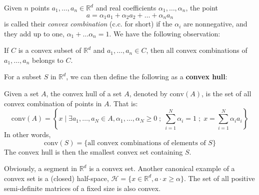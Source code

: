 Given $n$ points $a_{1},\dots,a_{n}\in \mathbb{R}^{d}$ and real coefficients $\alpha_{1},\dots,\alpha_{n}$, the point \begin{equation}
    a= \alpha_{1}a_{1} + \alpha_{2}a_{2} + \dots + \alpha_{n} a_{n}
\end{equation}
is called their \textit{convex combination} (c.c. for short) if the $\alpha_{i}$ are nonnegative, and they add up to one, $\alpha_{1}+\dots\alpha_{n}=1$. We have the following observation: 
\begin{lemma}
    If $C$ is a convex subset of $\mathbb{R}^{d}$ and $a_{1},\dots,a_{n}\in C$, then all convex combinations of $a_{1},\dots,a_{n}$ belongs to $C$. 
\end{lemma}
For a subset $S$ in $\mathbb{R}^{d}$, we can then define the following as a \textbf{convex hull}: 
\begin{definition}
    Given a set $A$, the convex hull of a set $A$, denoted by $\mathrm{conv}(A)$, is the set of all convex combination of points in $A$. That is: 
    \begin{equation}
        \mathrm{conv}(A) = \left\{ x \mid \exists a_{1},\dots,a_{N}\in A, \alpha_{1},\dots,\alpha_{N}\geq 0\; ;\; \sum^{N}_{i=1}\alpha_{i} = 1\; ;\;  x= \sum^{N}_{i=1}\alpha_{i} a_{i} \right\}
    \end{equation}
    In other words, 
    \begin{equation}
        \mathrm{conv}(S) = \{\text{all convex combinations of elements of }S\}
    \end{equation}
    The convex hull is then the smallest convex set containing $S$. 
\end{definition}

Obviously, a segment in $\mathbb{R}^{d}$ is a convex set. Another canonical example of a convex set is a (closed) half-space, $\mathcal{H}= \{x\in \mathbb{R}^{d}, a\cdot x \geq \alpha\}$. The set of all positive semi-definite matrices of a fixed size is also convex. 

